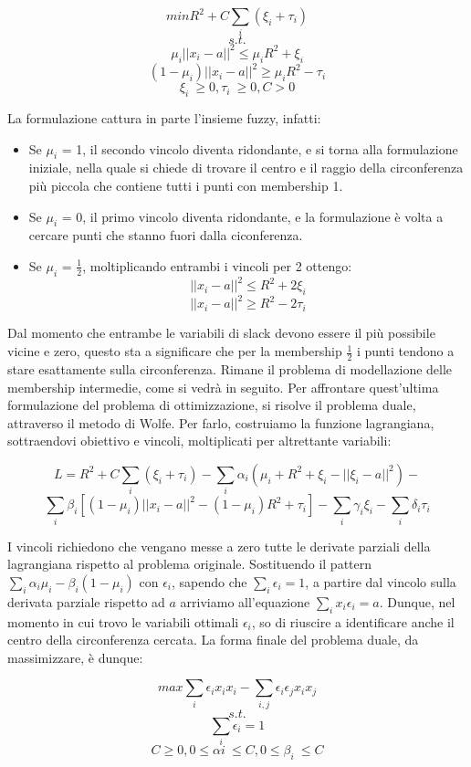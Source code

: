 \documentclass[12pt,a4paper]{report}
\begin{document}
\[ min R^2 + C\sum_{i} (\xi_{i} + \tau_{i})\]
\[s.t.\]
\[ \mu_i||x_i - a||^2  \leq \mu_i R^2 + \xi_{i}\]
\[ (1 - \mu_i)||x_i - a||^2  \geq \mu_i R^2 - \tau_{i}\]
\[ \xi_{i}\ \geq 0, \tau_{i}\ \geq 0 ,  C > 0\]

La formulazione cattura in parte l'insieme fuzzy, infatti:
\begin{itemize}
  \item Se  $\mu_i$ = 1, il secondo vincolo diventa ridondante, e si torna alla formulazione iniziale, nella quale si chiede di trovare il centro  e il raggio della circonferenza più piccola che contiene tutti i punti con membership 1.
  \item Se   $\mu_i$ = 0, il primo vincolo diventa ridondante, e la formulazione è volta a cercare punti che stanno fuori dalla ciconferenza.
  \item Se   $\mu_i$ = $\frac{1}{2}$, moltiplicando entrambi i vincoli per 2 ottengo:
\[ ||x_i - a||^2  \leq R^2 + 2\xi_{i}\]
\[ ||x_i - a||^2  \geq R^2 - 2\tau_{i}\]
\end{itemize}

Dal momento che entrambe le variabili di slack devono essere il più possibile vicine e zero, questo sta a significare che per la membership  $\frac{1}{2}$ i punti tendono a stare esattamente sulla circonferenza. Rimane il problema di modellazione delle membership intermedie, come si vedrà in seguito.
Per affrontare quest'ultima formulazione del problema di ottimizzazione, si risolve il problema duale, attraverso il metodo di Wolfe. Per farlo, costruiamo la funzione lagrangiana, sottraendovi obiettivo e vincoli, moltiplicati per altrettante variabili:

\[ L = R^2 + C\sum_{i}(\xi_i + \tau_i) - \sum_{i}\alpha_i(\mu_i+R^2 + \xi_i - ||\xi_i - a||^2) -\] 
\[\sum_{i}\beta_i[(1- \mu_i)||x_i - a||^2 - (1 - \mu_i)R^2 + \tau_i] -  \sum_{i}\gamma_i\xi_i - \sum_{i}\delta_i\tau_i\]

I vincoli richiedono che vengano messe a zero tutte le derivate parziali della lagrangiana rispetto al problema originale. Sostituendo il pattern $\sum_{i}\alpha_i\mu_i - \beta_i(1-\mu_i)$ con $\epsilon_i$, sapendo che $\sum_{i}\epsilon_i = 1$, a partire dal vincolo sulla derivata parziale rispetto ad $a$ arriviamo all'equazione  $\sum_{i}x_i\epsilon_i = a$. Dunque, nel momento in cui trovo le variabili ottimali $\epsilon_i$, so di riuscire a identificare anche il centro della circonferenza cercata.
La forma finale del problema duale, da massimizzare, è dunque:

\[ max \sum_{i}\epsilon_ix_ix_i - \sum_{i,j}\epsilon_i\epsilon_jx_ix_j\]
\[s.t.\]
\[\sum_i\epsilon_i = 1\]
\[ C \geq 0, 0 \leq \alpha{i}\ \leq C , 0 \leq \beta_{i}\ \leq C \]
\end{document}
